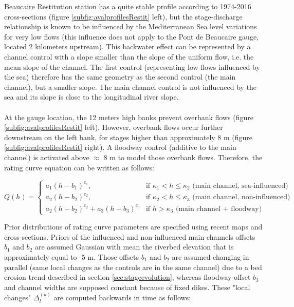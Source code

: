         Beaucaire Restitution station has a quite stable profile according to 1974-2016 cross-sections (figure \ref{subfig:avalprofilesRestit} left), but the stage-discharge relationship is known to be influenced by the Mediterranean Sea level variations for very low flows (this influence does not apply to the Pont de Beaucaire gauge, located 2 kilometers upstream). This backwater effect can be represented by a channel control with a slope smaller than the slope of the uniform flow, i.e. the mean slope of the channel. The first control (representing low flows influenced by the sea) therefore has the same geometry as the second control (the main channel), but a smaller slope. The main channel control is not influenced by the sea and its slope is close to the longitudinal river slope. 
        \paragraph{}At the gauge location, the 12 meters high banks prevent overbank flows (figure \ref{subfig:avalprofilesRestit} left). However, overbank flows occur further downstream on the left bank, for stages higher than approximately 8 m (figure \ref{subfig:avalprofilesRestit} right). A floodway control (additive to the main channel) is activated above $\approx$ 8 m to model those overbank flows. Therefore, the rating curve equation can be written as follows: 
        
        \begin{equation}
        Q(h) =
          \begin{cases}
           a_1(h-b_1)^{c_1}, & \text{if $\kappa_1 < h \leq \kappa_2 $ (main channel, sea-influenced) }\\
           a_2(h-b_2)^{c_2}, & \text{if $\kappa_2 < h \leq \kappa_3 $ (main channel, non-influenced)}\\
           a_2(h-b_2)^{c_2}+ a_3(h-b_3)^{c_3} & \text{if $h > \kappa_3$ (main channel + floodway)}
          \end{cases}
          \label{eq:RcRes}
        \end{equation}

        Prior distributions of rating curve parameters are specified using recent maps and cross-sections. Priors of the influenced and non-influenced main channels offsets $b_1$ and $b_2$ are assumed Gaussian with mean the riverbed elevation that is approximately equal to -5 m. Those offsets $b_1$ and $b_2$ are assumed changing in parallel (same local changes as the controls are in the same channel) due to a bed erosion trend described in section \ref{sec:stageevolution}, whereas floodway offset $b_3$ and channel widths are supposed constant because of fixed dikes. These "local changes" $\Delta_l^{(k)}$ are computed backwards in time as follows: 

